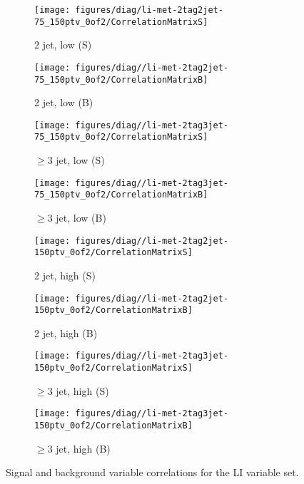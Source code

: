 \begin{figure}[!htbp]\captionsetup{justification=centering}
  \centering
\begin{subfigure}[t]{0.220000\textwidth}\centering\texttt{[image: figures/diag/li-met-2tag2jet-75\_150ptv\_0of2/CorrelationMatrixS]}\caption{2 jet, low \ptv (S)}\end{subfigure}
\begin{subfigure}[t]{0.220000\textwidth}\centering\texttt{[image: figures/diag//li-met-2tag2jet-75\_150ptv\_0of2/CorrelationMatrixB]}\caption{2 jet, low \ptv (B)}\end{subfigure}
\begin{subfigure}[t]{0.220000\textwidth}\centering\texttt{[image: figures/diag//li-met-2tag3jet-75\_150ptv\_0of2/CorrelationMatrixS]}\caption{$\ge3$ jet, low \ptv (S)}\end{subfigure}
\begin{subfigure}[t]{0.220000\textwidth}\centering\texttt{[image: figures/diag//li-met-2tag3jet-75\_150ptv\_0of2/CorrelationMatrixB]}\caption{$\ge3$ jet, low \ptv (B)}\end{subfigure}
\begin{subfigure}[t]{0.220000\textwidth}\centering\texttt{[image: figures/diag//li-met-2tag2jet-150ptv\_0of2/CorrelationMatrixS]}\caption{2 jet, high \ptv (S)}\end{subfigure}
\begin{subfigure}[t]{0.220000\textwidth}\centering\texttt{[image: figures/diag//li-met-2tag2jet-150ptv\_0of2/CorrelationMatrixB]}\caption{2 jet, high \ptv (B)}\end{subfigure}
\begin{subfigure}[t]{0.220000\textwidth}\centering\texttt{[image: figures/diag//li-met-2tag3jet-150ptv\_0of2/CorrelationMatrixS]}\caption{$\ge3$ jet, high \ptv (S)}\end{subfigure}
\begin{subfigure}[t]{0.220000\textwidth}\centering\texttt{[image: figures/diag//li-met-2tag3jet-150ptv\_0of2/CorrelationMatrixB]}\caption{$\ge3$ jet, high \ptv (B)}\end{subfigure}
  \caption{Signal and background variable correlations for the LI variable set.}
  \label{fig:li-met-Correlations}
\end{figure}
\clearpage
